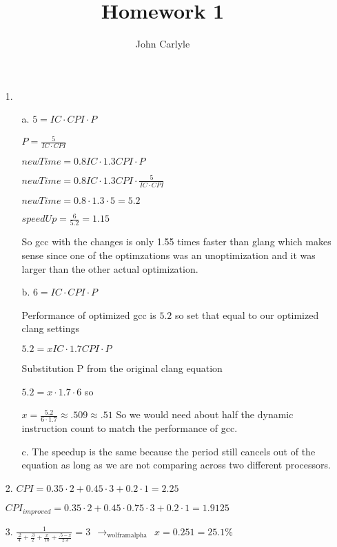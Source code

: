 \documentclass{article}
\author{John Carlyle}
\title{Homework 1}
\begin{document}
\maketitle

\begin{itemize}
\item[1.]
  \begin{itemize}
    \item[a.] 
      $5 = IC \cdot CPI \cdot P$ 
      
      $P = \frac{5}{IC \cdot CPI}$
      
      $newTime = 0.8IC \cdot 1.3CPI \cdot P$ 

      $newTime = 0.8IC \cdot 1.3CPI \cdot \frac{5}{IC \cdot CPI}$

      $newTime = 0.8 \cdot 1.3 \cdot 5 = 5.2$

      $speedUp = \frac{6}{5.2} = 1.15$

      So gcc with the changes is only 1.55 times faster than glang which makes sense since one of the optimzations was an unoptimization and it was larger than the other actual optimization.
    \item[b.]
      $6 = IC \cdot CPI \cdot P$

      Performance of optimized gcc is $5.2$ so set that equal to our optimized clang settings

      $5.2 = xIC \cdot 1.7CPI \cdot P$

      Substitution P from the original clang equation

      $5.2 = x \cdot 1.7 \cdot 6$ so

      $x = \frac{5.2}{6 \cdot 1.7} \approx .509 \approx .51$ So we would need about half the dynamic instruction count to match the performance of gcc.
    \item[c.]
      The speedup is the same because the period still cancels out of the equation as long as we are not comparing across two different processors.

  \end{itemize}

  \item[2.]
    $CPI = 0.35 \cdot 2 + 0.45 \cdot 3 + 0.2 \cdot 1 = 2.25$

    $CPI_{improved} = 0.35 \cdot 2 + 0.45 \cdot 0.75 \cdot 3 + 0.2 \cdot 1 = 1.9125$

  \item[3.]
    $\frac{1}{\frac{.2}{4} + \frac{.3}{2} + \frac{x}{10} + \frac{.5-x}{2.3}} = 3 ~~ \rightarrow_{ \text{wolframalpha}} ~~ x = 0.251 = 25.1\%$


\end{itemize}
\end{document}
